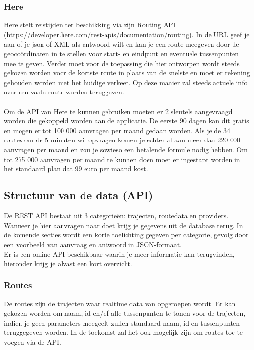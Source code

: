 \documentclass[ps,a4paper,oneside]{report}
\begin{document}
\subsubsection{Here}
Here stelt reistijden ter beschikking via zijn Routing API \\(https://developer.here.com/rest-apis/documentation/routing). In de URL geef je aan of je json of XML als antwoord wilt en kan je een route meegeven door de geoco\"ordinaten in te stellen voor start- en eindpunt en eventuele tussenpunten mee te geven. Verder moet voor de toepassing die hier ontworpen wordt steeds gekozen worden voor de kortste route in plaats van de snelste en moet er rekening gehouden worden met het huidige verkeer. Op deze manier zal steeds actuele info over een vaste route worden teruggeven.\\\\
Om de API van Here te kunnen gebruiken moeten er 2 sleutels aangevraagd worden die gekoppeld worden aan de applicatie. De eerste 90 dagen kan dit gratis en mogen er tot 100 000 aanvragen per maand gedaan worden. Als je de 34 routes om de 5 minuten wil opvragen komen je echter al aan meer dan 220 000 aanvragen per maand en zou je sowieso een betalende formule nodig hebben. Om tot 275 000 aanvragen per maand te kunnen doen moet er ingestapt worden in het standaard plan dat 99 euro per maand kost.\\
\subsection{Structuur van de data (API)}
De REST API bestaat uit 3 categorie\"en: trajecten, routedata en providers. Wanneer je hier aanvragen naar doet krijg je gegevens uit de database terug. In de komende secties wordt een korte toelichting gegeven per categorie, gevolg door een voorbeeld van aanvraag en antwoord in JSON-formaat. \\Er is een online API beschikbaar waarin je meer informatie kan terugvinden, hieronder krijg je alvast een kort overzicht.

\subsubsection{Routes}
De routes zijn de trajecten waar realtime data van opgeroepen wordt. Er kan gekozen worden om naam, id en/of alle tussenpunten te tonen voor de trajecten, indien je geen parameters meegeeft zullen standaard naam, id en tussenpunten teruggegeven worden. In de toekomst zal het ook mogelijk zijn om routes toe te voegen via de API.\\
\end{document}
